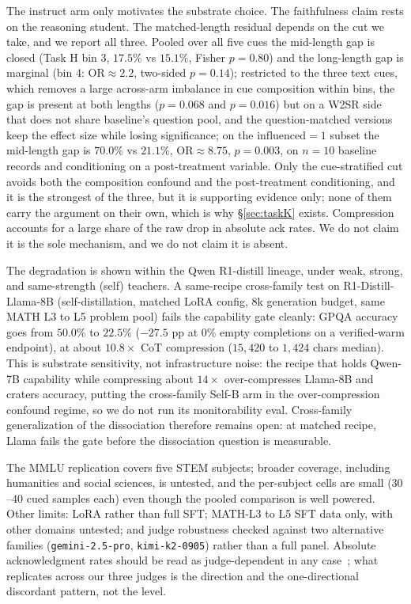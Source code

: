\documentclass{article}
\begin{document}
The instruct arm only motivates the substrate choice. The faithfulness claim
rests on the reasoning student. The matched-length residual depends on the cut
we take, and we report all three. Pooled over all five cues the mid-length gap
is closed (Task H bin 3, $17.5\%$ vs $15.1\%$, Fisher $p = 0.80$) and the
long-length gap is marginal (bin 4: $\mathrm{OR} \approx 2.2$, two-sided
$p = 0.14$); restricted to the three text cues, which removes a large
across-arm imbalance in cue composition within bins, the gap is present at
both lengths ($p = 0.068$ and $p = 0.016$) but on a W2SR side that does not
share baseline's question pool, and the question-matched versions keep the
effect size while losing significance; on the $\mathrm{influenced} = 1$
subset the mid-length gap is $70.0\%$ vs $21.1\%$, $\mathrm{OR} \approx 8.75$,
$p = 0.003$, on $n = 10$ baseline records and conditioning on a post-treatment
variable. Only the cue-stratified cut avoids both the composition confound and
the post-treatment conditioning, and it is the strongest of the three, but it is
supporting evidence only;
none of them carry the argument on their own, which is why \S\ref{sec:taskK}
exists. Compression accounts for a large share of the raw drop in absolute ack
rates. We do not claim it is the sole mechanism, and we do not claim it is
absent.

The degradation is shown within the Qwen R1-distill lineage, under weak,
strong, and same-strength (self) teachers. A same-recipe cross-family test on
R1-Distill-Llama-8B (self-distillation, matched LoRA config, 8k generation
budget, same MATH L3 to L5 problem pool) fails the capability gate cleanly:
GPQA accuracy goes from $50.0\%$ to $22.5\%$ ($-27.5$ pp at $0\%$ empty
completions on a verified-warm endpoint), at about $10.8\times$ CoT
compression ($15{,}420$ to $1{,}424$ chars median). This is substrate
sensitivity, not infrastructure noise: the recipe that holds Qwen-7B
capability while compressing about $14\times$ over-compresses Llama-8B and
craters accuracy, putting the cross-family Self-B arm in the
over-compression confound regime, so we do not run its monitorability eval.
Cross-family generalization of the dissociation therefore remains open: at
matched recipe, Llama fails the gate before the dissociation question is
measurable.

The MMLU replication covers five STEM subjects; broader coverage, including
humanities and social sciences, is untested, and the per-subject cells are
small ($30$--$40$ cued samples each) even though the pooled comparison is
well powered. Other limits: LoRA rather than full SFT; MATH-L3 to L5
SFT data only, with other domains untested; and judge robustness checked
against two alternative families (\texttt{gemini-2.5-pro},
\texttt{kimi-k2-0905}) rather than a full panel. Absolute acknowledgment rates
should be read as judge-dependent in any case~\cite{young2026classifier};
what replicates across our three judges is the direction and the
one-directional discordant pattern, not the level.
\end{document}
